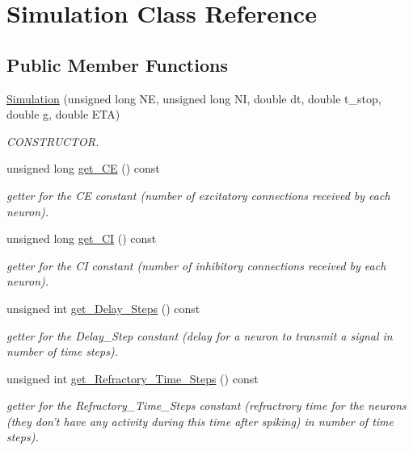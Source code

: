 \hypertarget{classSimulation}{\section{Simulation Class Reference}
\label{classSimulation}
}
\subsection*{Public Member Functions}
\begin{DoxyCompactItemize}
\item 
\hyperlink{classSimulation_ad78c2f6a52ef4ffc4dbc331cb4ed1b08}{Simulation} (unsigned long N\-E, unsigned long N\-I, double dt, double t\-\_\-stop, double g, double E\-T\-A)
\begin{DoxyCompactList}\small\item\em C\-O\-N\-S\-T\-R\-U\-C\-T\-O\-R. \end{DoxyCompactList}\item 
unsigned long \hyperlink{classSimulation_a8f9167d5abf40f9c4463fc8ce6714e23}{get\-\_\-\-C\-E} () const 
\begin{DoxyCompactList}\small\item\em getter for the C\-E constant (number of excitatory connections received by each neuron). \end{DoxyCompactList}\item 
unsigned long \hyperlink{classSimulation_a6a0fb4842ca82431468a9e98561360f2}{get\-\_\-\-C\-I} () const 
\begin{DoxyCompactList}\small\item\em getter for the C\-I constant (number of inhibitory connections received by each neuron). \end{DoxyCompactList}\item 
unsigned int \hyperlink{classSimulation_ae1f8c8afe524dd4c312037796698e533}{get\-\_\-\-Delay\-\_\-\-Steps} () const 
\begin{DoxyCompactList}\small\item\em getter for the Delay\-\_\-\-Step constant (delay for a neuron to transmit a signal in number of time steps). \end{DoxyCompactList}\item 
unsigned int \hyperlink{classSimulation_a5c16f085c358e3fb72d1c32e6d9bb0ec}{get\-\_\-\-Refractory\-\_\-\-Time\-\_\-\-Steps} () const 
\begin{DoxyCompactList}\small\item\em getter for the Refractory\-\_\-\-Time\-\_\-\-Steps constant (refractrory time for the neurons (they don't have any activity during this time after spiking) in number of time steps). \end{DoxyCompactList}\item 

\end{DoxyCompactItemize}
